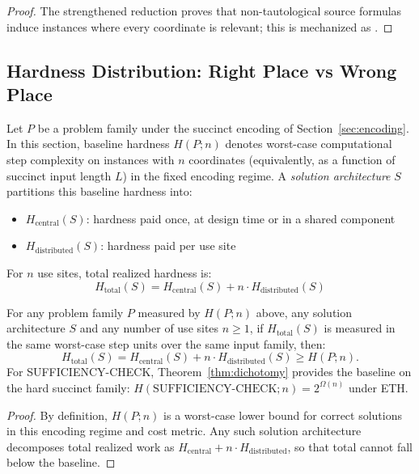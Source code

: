 \begin{proof}
The strengthened reduction proves that non-tautological source formulas induce instances where every coordinate is relevant; this is mechanized as .
\end{proof}

\subsection{Hardness Distribution: Right Place vs Wrong Place}\label{sec:hardness-distribution}

\begin{definition}\label{def:hardness-distribution}
Let $P$ be a problem family under the succinct encoding of Section~\ref{sec:encoding}. In this section, baseline hardness $H(P;n)$ denotes worst-case computational step complexity on instances with $n$ coordinates (equivalently, as a function of succinct input length $L$) in the fixed encoding regime. A \emph{solution architecture} $S$ partitions this baseline hardness into:
\begin{itemize}
\item $H_{\text{central}}(S)$: hardness paid once, at design time or in a shared component
\item $H_{\text{distributed}}(S)$: hardness paid per use site
\end{itemize}
For $n$ use sites, total realized hardness is:
\[H_{\text{total}}(S) = H_{\text{central}}(S) + n \cdot H_{\text{distributed}}(S)\]
\end{definition}

\begin{proposition}\label{prop:hardness-conservation}
For any problem family $P$ measured by $H(P;n)$ above, any solution architecture $S$ and any number of use sites $n \ge 1$, if $H_{\text{total}}(S)$ is measured in the same worst-case step units over the same input family, then:
\[
H_{\text{total}}(S) = H_{\text{central}}(S) + n \cdot H_{\text{distributed}}(S) \geq H(P;n).
\]
For SUFFICIENCY-CHECK, Theorem~\ref{thm:dichotomy} provides the baseline on the hard succinct family: $H(\text{SUFFICIENCY-CHECK};n)=2^{\Omega(n)}$ under ETH.
\end{proposition}

\begin{proof}
By definition, $H(P;n)$ is a worst-case lower bound for correct solutions in this encoding regime and cost metric. Any such solution architecture decomposes total realized work as $H_{\text{central}} + n\cdot H_{\text{distributed}}$, so that total cannot fall below the baseline.
\end{proof}

